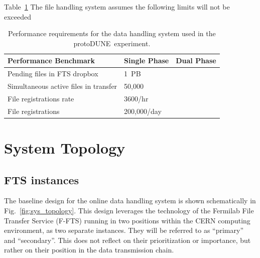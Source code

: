 \documentclass[pdftex,12pt,letter]{article}
\newcommand{\pd}{protoDUNE\ }
\begin{document}
Table~\ref{fig:dh_perf} The file handling system assumes the following limits will not be exceeded

\begin{table}[tbh]
\centering
\begin{tabular}{l l l}
\hline
\textbf{Performance Benchmark} & \textbf{Single Phase} & \textbf{Dual Phase}\\
\hline
\hline
Pending files in FTS dropbox             & 1~PB        & \\
Simultaneous active files in transfer    & 50,000      & \\
File registrations rate                  & 3600/hr     & \\
File registrations                       & 200,000/day & \\
\hline
\end{tabular}
\caption{\label{fig:dh_perf}Performance requirements for the data handling system used in the \pd experiment.}
\end{table}

\section{System Topology}
\subsection{FTS instances}
The baseline design for the online data handling system is shown schematically in Fig.~\ref{fig:sys_topology}.  This design leverages the technology of the Fermilab
File Transfer Service (F-FTS) running in two positions within the CERN computing environment, as two separate instances. They will be referred to as ``primary'' and
``secondary''. This does not reflect on their prioritization or importance, but rather on their position in the data transmission chain.
\end{document}
